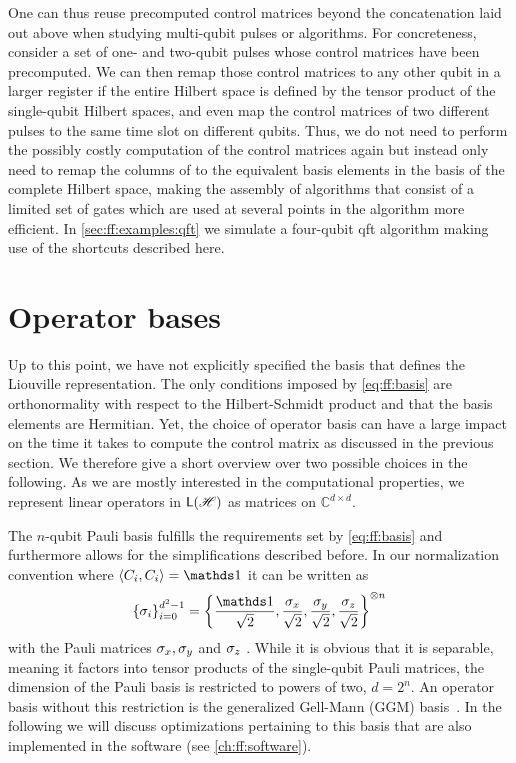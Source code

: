 One can thus reuse precomputed control matrices beyond the concatenation laid out above when studying multi-qubit pulses or algorithms.
For concreteness, consider a set of one- and two-qubit pulses whose control matrices have been precomputed.
We can then remap those control matrices to any other qubit in a larger register if the entire Hilbert space is defined by the tensor product of the single-qubit Hilbert spaces, and even map the control matrices of two different pulses to the same time slot on different qubits.
Thus, we do not need to perform the possibly costly computation of the control matrices again but instead only need to remap the columns of \ctrlmat to the equivalent basis elements in the basis of the complete Hilbert space, making the assembly of algorithms that consist of a limited set of gates which are used at several points in the algorithm more efficient.
In \cref{sec:ff:examples:qft} we simulate a four-qubit \gls{qft} algorithm making use of the shortcuts described here.

\section{Operator bases}\label{sec:ff:performance:basis}
Up to this point, we have not explicitly specified the basis that defines the Liouville representation.
The only conditions imposed by \cref{eq:ff:basis} are orthonormality with respect to the Hilbert-Schmidt product and that the basis elements are Hermitian.
Yet, the choice of operator basis can have a large impact on the time it takes to compute the control matrix as discussed in the previous section.
We therefore give a short overview over two possible choices in the following.
As we are mostly interested in the computational properties, we represent linear operators in $\mathsf{L}(\mathscr{H})$ as matrices on $\mathbb{C}^{d\times d}$.

The $n$-qubit Pauli basis fulfills the requirements set by \cref{eq:ff:basis} and furthermore allows for the simplifications described before.
In our normalization convention where $\dotHS{C_i}{C_i} = \eye$ it can be written as
\begin{equation}\label{eq:ff:basis:pauli}
    \left\lbrace\sigma_i\right\rbrace_{i=0}^{d^2-1} = \left\lbrace
                                                          \frac{\eye}{\sqrt{2}},
                                                          \frac{\px}{\sqrt{2}},
                                                          \frac{\py}{\sqrt{2}},
                                                          \frac{\pz}{\sqrt{2}}
                                                      \right\rbrace^{\otimes n}
\end{equation}
with the Pauli matrices $\sigma_x,\sigma_y$ and $\sigma_z$ .
While it is obvious that it is separable, meaning it factors into tensor products of the single-qubit Pauli matrices, the dimension of the Pauli basis is restricted to powers of two, \ie $d = 2^n$.
An operator basis without this restriction is the generalized Gell-Mann (GGM) basis~\cite{Kimura2003,Bertlmann2008}.
In the following we will discuss optimizations pertaining to this basis that are also implemented in the software (see \cref{ch:ff:software}).

